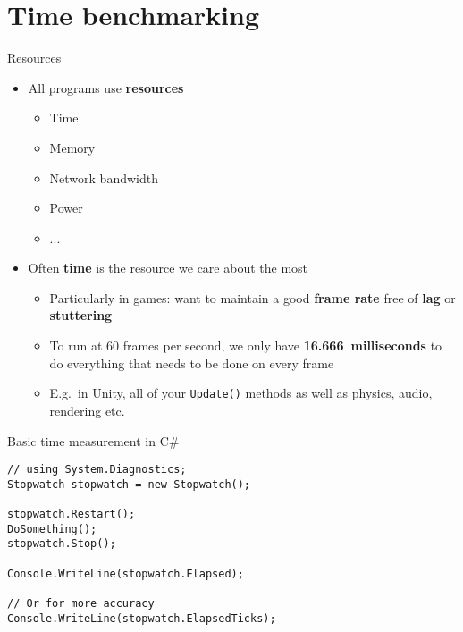 \part{Time benchmarking}
\frame{\partpage}

\begin{frame}{Resources}
    \begin{itemize}
        \pause\item All programs use \textbf{resources}
            \begin{itemize}
                \pause\item Time
                \pause\item Memory
                \pause\item Network bandwidth
                \pause\item Power
                \pause\item ...
            \end{itemize}
        \pause\item Often \textbf{time} is the resource we care about the most
            \begin{itemize}
                \pause\item Particularly in games:
                    want to maintain a good \textbf{frame rate}
                    free of \textbf{lag} or \textbf{stuttering}
                \pause\item To run at 60 frames per second, we only have \textbf{16.666~milliseconds} to do everything that needs to be done on every frame
                \pause\item E.g.\ in Unity, all of your \lstinline{Update()} methods as well as physics, audio, rendering etc.
            \end{itemize}
    \end{itemize}
\end{frame}

\begin{frame}[fragile]{Basic time measurement in C\#}
    \begin{lstlisting}
// using System.Diagnostics;
Stopwatch stopwatch = new Stopwatch();

stopwatch.Restart();
DoSomething();
stopwatch.Stop();

Console.WriteLine(stopwatch.Elapsed);

// Or for more accuracy
Console.WriteLine(stopwatch.ElapsedTicks);
    \end{lstlisting}
\end{frame}


